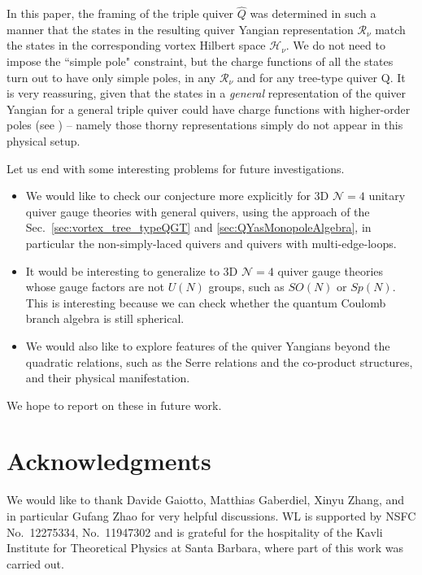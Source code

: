 \documentclass[12pt,a4paper]{article}
\renewcommand{\(}{\left(}
\renewcommand{\)}{\right)}
\renewcommand{\(}{\left(}
\renewcommand{\)}{\right)}
\begin{document}
In this paper, the framing of the triple quiver $\widehat{Q}$ was determined in such a manner that the states in the resulting quiver Yangian representation $\mathcal{R}_{\nu}$ match the states in the corresponding vortex Hilbert space $\mathcal{H}_{\nu}$. 
We do not need to impose the ``simple pole" constraint, but  the charge functions of all the states  turn out to have only simple poles, in any $\mathcal{R}_{\nu}$ and for any tree-type quiver $\mathrm{Q}$. 
It is very reassuring, given that the states in a \textit{general} representation of the quiver Yangian for a general triple quiver could have charge functions with higher-order poles (see \cite[App.~C]{Li:2023zub}) -- namely those thorny representations simply do not appear in this physical setup.

\medskip



\medskip

Let us end with some interesting problems for future investigations.

\begin{itemize}
\item We would like to check our conjecture more explicitly for 3D $\mathcal{N}=4$ unitary quiver gauge theories with general quivers, using the approach of the Sec.~\ref{sec:vortex_tree_typeQGT} and \ref{sec:QYasMonopoleAlgebra}, in particular the non-simply-laced quivers and quivers with multi-edge-loops. 
\item It would be interesting to generalize to 3D $\mathcal{N}=4$ quiver gauge theories whose gauge factors are not $U(N)$ groups, such as $SO(N)$ or $Sp(N)$.
This is interesting because we can check whether the quantum Coulomb branch algebra is still spherical.
\item We would also like to explore features of the quiver Yangians beyond the quadratic relations, such as the Serre relations and the co-product structures, and their physical manifestation. 
\end{itemize}
We hope to report on these in future work.

\section*{Acknowledgments}

We would like to thank Davide Gaiotto, Matthias Gaberdiel, Xinyu Zhang, and in particular Gufang Zhao for very helpful discussions.
WL is supported by NSFC  No.\ 12275334, No.\ 11947302 and is grateful for the hospitality of the Kavli Institute for Theoretical Physics at Santa Barbara, where part of this work was carried out. 
\end{document}
